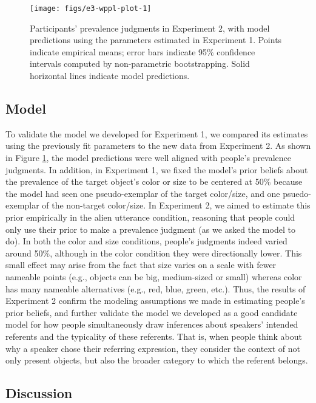 \documentclass{ucetd}
\begin{document}
\begin{figure}[!tb]

{\centering \texttt{[image: figs/e3-wppl-plot-1]} 

}

\caption{Participants' prevalence judgments in Experiment 2, with model predictions using the parameters estimated in Experiment 1. Points indicate empirical means; error bars indicate 95\% confidence intervals computed by non-parametric bootstrapping. Solid horizontal lines indicate model predictions.}\label{fig:e3-wppl-plot}
\end{figure}

\hypertarget{model-1}{%
\subsection{Model}\label{model-1}}

To validate the model we developed for Experiment 1, we compared its
estimates using the previously fit parameters to the new data from
Experiment 2. As shown in Figure \ref{fig:e3-wppl-plot}, the model
predictions were well aligned with people's prevalence judgments. In
addition, in Experiment 1, we fixed the model's prior beliefs about the
prevalence of the target object's color or size to be centered at 50\%
because the model had seen one pseudo-exemplar of the target color/size,
and one psuedo-exemplar of the non-target color/size. In Experiment 2,
we aimed to estimate this prior empirically in the alien utterance
condition, reasoning that people could only use their prior to make a
prevalence judgment (as we asked the model to do). In both the color and
size conditions, people's judgments indeed varied around 50\%, although
in the color condition they were directionally lower. This small effect
may arise from the fact that size varies on a scale with fewer nameable
points (e.g., objects can be big, medium-sized or small) whereas color
has many nameable alternatives (e.g., red, blue, green, etc.). Thus, the
results of Experiment 2 confirm the modeling assumptions we made in
estimating people's prior beliefs, and further validate the model we
developed as a good candidate model for how people simultaneously draw
inferences about speakers' intended referents and the typicality of
these referents. That is, when people think about why a speaker chose
their referring expression, they consider the context of not only
present objects, but also the broader category to which the referent
belongs.

\hypertarget{discussion-2}{%
\subsection{Discussion}\label{discussion-2}}
\end{document}
